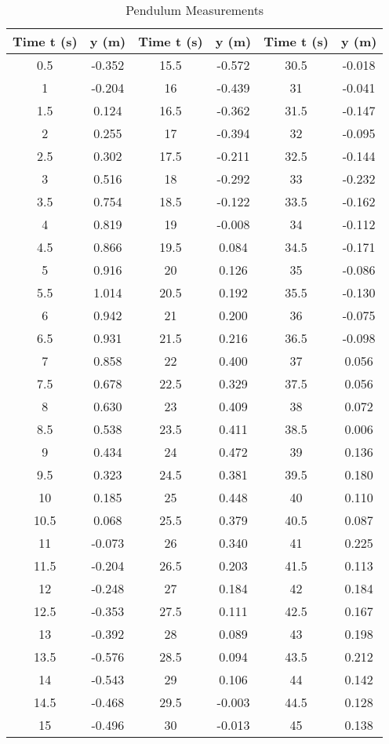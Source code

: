 \begin{appendix}
	\begin{table}[H]
		\centering
		\begin{tabular}{c|c||c|c||c|c}
			Time t (s) & y (m) & Time t (s) & y (m) & Time t (s) & y (m) \\
			\hline\hline
			0.5 & -0.352 & 15.5 & -0.572 & 30.5 & -0.018 \\ \hline
			1 & -0.204 & 16 & -0.439 & 31 & -0.041 \\ \hline
			1.5 & 0.124 & 16.5 & -0.362 & 31.5 & -0.147 \\ \hline
			2 & 0.255 & 17 & -0.394 & 32 & -0.095 \\ \hline
			2.5 & 0.302 & 17.5 & -0.211 & 32.5 & -0.144 \\ \hline
			3 & 0.516 & 18 & -0.292 & 33 & -0.232 \\ \hline
			3.5 & 0.754 & 18.5 & -0.122 & 33.5 & -0.162 \\ \hline
			4 & 0.819 & 19 & -0.008 & 34 & -0.112 \\ \hline
			4.5 & 0.866 & 19.5 & 0.084 & 34.5 & -0.171 \\ \hline
			5 & 0.916 & 20 & 0.126 & 35 & -0.086 \\ \hline
			5.5 & 1.014 & 20.5 & 0.192 & 35.5 & -0.130 \\ \hline
			6 & 0.942 & 21 & 0.200 & 36 & -0.075 \\ \hline
			6.5 & 0.931 & 21.5 & 0.216 & 36.5 & -0.098 \\ \hline
			7 & 0.858 & 22 & 0.400 & 37 & 0.056 \\ \hline
			7.5 & 0.678 & 22.5 & 0.329 & 37.5 & 0.056 \\ \hline
			8 & 0.630 & 23 & 0.409 & 38 & 0.072 \\ \hline
			8.5 & 0.538 & 23.5 & 0.411 & 38.5 & 0.006 \\ \hline
			9 & 0.434 & 24 & 0.472 & 39 & 0.136 \\ \hline
			9.5 & 0.323 & 24.5 & 0.381 & 39.5 & 0.180 \\ \hline
			10 & 0.185 & 25 & 0.448 & 40 & 0.110 \\ \hline
			10.5 & 0.068 & 25.5 & 0.379 & 40.5 & 0.087 \\ \hline
			11 & -0.073 & 26 & 0.340 & 41 & 0.225 \\ \hline
			11.5 & -0.204 & 26.5 & 0.203 & 41.5 & 0.113 \\ \hline
			12 & -0.248 & 27 & 0.184 & 42 & 0.184 \\ \hline
			12.5 & -0.353 & 27.5 & 0.111 & 42.5 & 0.167 \\ \hline
			13 & -0.392 & 28 & 0.089 & 43 & 0.198 \\ \hline
			13.5 & -0.576 & 28.5 & 0.094 & 43.5 & 0.212 \\ \hline
			14 & -0.543 & 29 & 0.106 & 44 & 0.142 \\ \hline
			14.5 & -0.468 & 29.5 & -0.003 & 44.5 & 0.128 \\ \hline
			15 & -0.496 & 30 & -0.013 & 45 & 0.138 \\ \hline
		\end{tabular}
		\caption{Pendulum Measurements}
		\label{tab:Pendulum_Measurements}
	\end{table}


\end{appendix}
